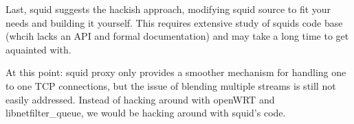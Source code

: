 \documentclass{article}
\begin{document}
Last, squid suggests the hackish approach, modifying squid source to fit your needs and building it yourself. This requires extensive study of squids code base (whcih lacks an API and formal documentation) and may take a long time to get aquainted with. 

At this point: squid proxy only provides a smoother mechanism for handling one to one TCP connections, but the issue of blending multiple streams is still not easily addressed. Instead of hacking around with openWRT and libnetfilter\_queue, we would be hacking around with squid's code. 
\end{document}
